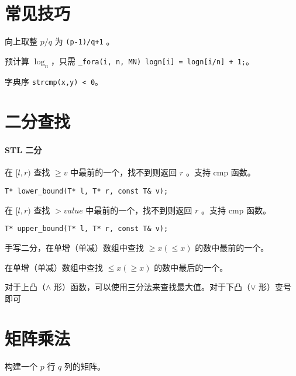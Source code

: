 \documentclass{probook}
\begin{document}
\begin{multicols}{2}
\section{常见技巧}

向上取整 $p/q$ 为 \lstinline[style=cpp]{(p-1)/q+1} 。

预计算 $\log_n$，只需 \lstinline[style=cpp]{_fora(i, n, MN) logn[i] = logn[i/n] + 1;}。

字典序 \lstinline[style=cpp]{strcmp(x,y) < 0}。

\section{二分查找}

\paragraph*{STL 二分}

在 $[l,r)$ 查找 $\geqslant v$ 中最前的一个，找不到则返回 $r$ 。支持 cmp 函数。

\begin{lstlisting}[style=cpp]
T* lower_bound(T* l, T* r, const T& v);
\end{lstlisting}

在 $[l,r)$ 查找 $> value$ 中最前的一个，找不到则返回 $r$ 。支持 cmp 函数。

\begin{lstlisting}[style=cpp]
T* upper_bound(T* l, T* r, const T& v);
\end{lstlisting}

手写二分，在单增（单减）数组中查找 $\geqslant x(\leqslant x)$ 的数中最前的一个。



在单增（单减）数组中查找 $\leqslant x(\geqslant x)$ 的数中最后的一个。



对于上凸（$\wedge$ 形）函数，可以使用三分法来查找最大值。对于下凸（$\vee$ 形）变号即可



\section{矩阵乘法}

构建一个 $p$ 行 $q$ 列的矩阵。


\end{multicols}
\end{document}
